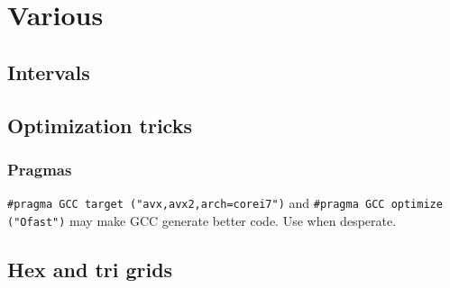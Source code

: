 
\chapter{Various}

	\section{Intervals}

	\section{Optimization tricks}
		\subsection{Pragmas}
			\lstinline{#pragma GCC target ("avx,avx2,arch=corei7")} and \lstinline{#pragma GCC optimize ("Ofast")} may make GCC generate better code. Use when desperate.

	\section{Hex and tri grids}
